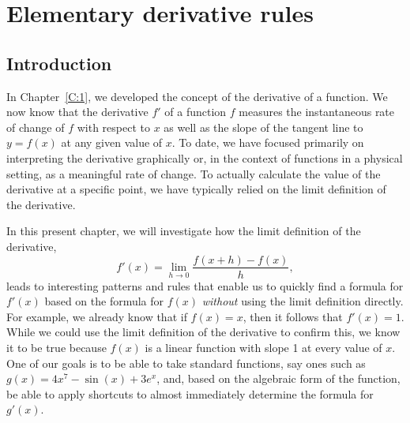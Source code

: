 \section{Elementary derivative rules} \label{S:2.1.ElemRules}

\vspace*{-14 pt}

\subsection*{Introduction}

In Chapter~\ref{C:1}, we developed the concept of the derivative of a function.  We now know that the derivative $f'$ of a function $f$ measures the instantaneous rate of change of $f$ with respect to $x$ as well as the slope of the tangent line to $y=f(x)$ at any given value of $x$.  To date, we have focused primarily on interpreting the derivative graphically or, in the context of functions in a physical setting, as a meaningful rate of change.  To actually calculate the value of the derivative at a specific point, we have typically relied on the limit definition of the derivative.

In this present chapter, we will investigate how the limit definition of the derivative,
$$f'(x) = \lim_{h \to 0} \frac{f(x+h)-f(x)}{h},$$
leads to interesting patterns and rules that enable us to quickly find a formula for $f'(x)$ based on the formula for $f(x)$ \emph{without} using the limit definition directly.  For example, we already know that if $f(x) = x$, then it follows that $f'(x) = 1$.  While we could use the limit definition of the derivative to confirm this, we know it to be true because $f(x)$ is a linear function with slope 1 at every value of $x$.  One of our goals is to be able to take standard functions, say ones such as $g(x) = 4x^7 - \sin(x) + 3e^x$, and, based on the algebraic form of the function, be able to apply shortcuts to almost immediately determine the formula for $g'(x)$.

